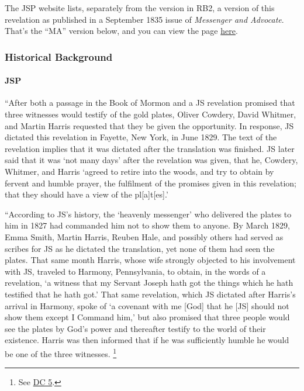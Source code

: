		The JSP website lists, separately from the version in RB2, a version of this revelation as published in a September 1835 issue of \textit{Messenger and Advocate}. That's the ``MA'' version below, and you can view the page \href{www.josephsmithpapers.org/paper-summary/revelation-june-1829-e-as-published-in-messenger-and-advocate-dc-17/1}{here}.
	
	\subsubsection{Historical Background}
		\label{DC17-HB}
		
		\paragraph{JSP}
		
			``After both a passage in the Book of Mormon and a JS revelation promised that three witnesses would testify of the gold plates, Oliver Cowdery, David Whitmer, and Martin Harris requested that they be given the opportunity. In response, JS dictated this revelation in Fayette, New York, in June 1829. The text of the revelation implies that it was dictated after the translation was finished. JS later said that it was `not many days' after the revelation was given, that he, Cowdery, Whitmer, and Harris `agreed to retire into the woods, and try to obtain by fervent and humble prayer, the fulfilment of the promises given in this revelation; that they should have a view of the pl[a]t[es].'
			
			``According to JS's history, the `heavenly messenger' who delivered the plates to him in 1827 had commanded him not to show them to anyone. By March 1829, Emma Smith, Martin Harris, Reuben Hale, and possibly others had served as scribes for JS as he dictated the translation, yet none of them had seen the plates. That same month Harris, whose wife strongly objected to his involvement with JS, traveled to Harmony, Pennsylvania, to obtain, in the words of a revelation, `a witness that my Servant Joseph hath got the things which he hath testified that he hath got.' That same revelation, which JS dictated after Harris's arrival in Harmony, spoke of `a covenant with me [God] that he [JS] should not show them except I Command him,' but also promised that three people would see the plates by God's power and thereafter testify to the world of their existence. Harris was then informed that if he was sufficiently humble he would be one of the three witnesses.%
			\footnote{%
				See \hyperref[DC5]{DC 5}.
				} 
			
